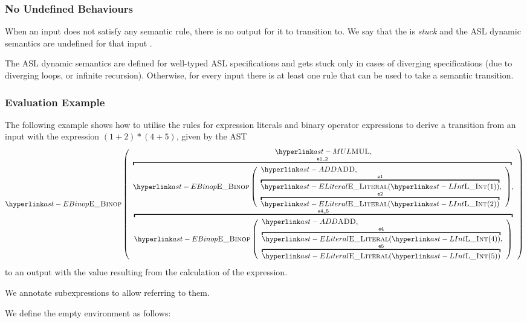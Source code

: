 \subsubsection{No Undefined Behaviours}
When an input \semanticsconfigurationterm{} does not satisfy any semantic rule,
there is no output \semanticsconfigurationterm{} for it to transition to. We say that
the \semanticsconfigurationterm{} is \emph{stuck} and the ASL dynamic semantics are undefined for that
input \semanticsconfigurationterm{}.

The ASL dynamic semantics are defined for well-typed ASL specifications
and gets stuck only in cases of diverging specifications
(due to diverging loops, or infinite recursion).
Otherwise, for every input \semanticsconfigurationterm{} there is at least one rule that can be used to take a semantic transition.

\hypertarget{eval-example}{}
\subsubsection{Evaluation Example}
The following example shows how to utilise the rules for expression literals and binary operator expressions
to derive a transition from an input \semanticsconfigurationterm{} with the expression $(1+2)*(4+5)$,
given by the AST
\[
  \EBinop\left(
    \begin{array}{c}
  \MUL, \\
  \overname{\EBinop\left(
  \begin{array}{l} \ADD, \\ \overname{\elint{1}}{\veone}, \\ \overname{\elint{2}}{\vetwo} \end{array}
                \right)}{\veonetwo}, \\
  \overname{\EBinop\left(
  \begin{array}{l }\ADD, \\ \overname{\elint{4}}{\vefour}, \\ \overname{\elint{5}}{\vefive} \end{array}
                \right)}{\vefourfive}
    \end{array}
          \right)
\]
to an output \semanticsconfigurationterm{} with the value resulting from the calculation of the expression.

We annotate subexpressions to allow referring to them.

We define the empty environment as follows:

